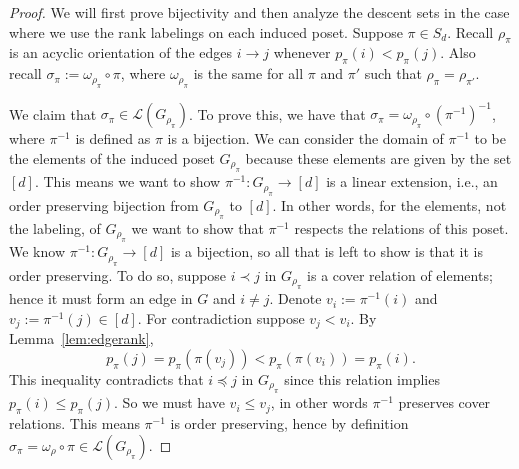 \documentclass[11pt]{amsart}
\newcommand{\rk}[1][\pi]{p_{#1}}
\begin{document}
\begin{proof}
    We will first prove bijectivity and then analyze the descent sets in the case where we use the rank labelings on each induced poset. 
    Suppose $\pi \in S_d$. Recall $\rho_\pi$ is an acyclic orientation of the edges $i \to j$ whenever $\rk(i) < \rk(j)$. Also recall $\sigma_\pi := \omega_{\rho_\pi} \circ \pi$, where $\omega_{\rho_\pi}$ is the same for all $\pi$ and $\pi'$ such that $\rho_\pi=\rho_{\pi'}$.
    
    We claim that $\sigma_\pi \in \mathcal{L}(G_{\rho_\pi})$. 
    To prove this, we have that $\sigma_\pi = \omega_{\rho_\pi} \circ (\pi^{-1})^{-1}$, where $\pi^{-1}$ is defined as $\pi$ is a bijection.
    We can consider the domain of $\pi^{-1}$ to be the elements of the induced poset $G_{\rho_\pi}$ because these elements are given by the set $[d]$.
    This means we want to show $\pi^{-1}:G_{\rho_\pi} \to [d]$ is a linear extension, i.e., an order preserving bijection from $G_{\rho_\pi}$ to $[d]$.
    In other words, for the elements, not the labeling, of $G_{\rho_\pi}$ we want to show that $\pi^{-1}$ respects the relations of this poset.
    We know $\pi^{-1}:G_{\rho_\pi} \to [d]$ is a bijection, so all that is left to show is that it is order preserving.
    To do so, suppose $i \prec j$ in $G_{\rho_\pi}$ is a cover relation of elements; hence it must form an edge in $G$ and $i \neq j$. 
    Denote $v_i := \pi^{-1}(i)$ and $v_j:=\pi^{-1}(j) \in [d]$. 
    For contradiction suppose $v_j < v_i$. By Lemma~\ref{lem:edgerank},
    \[
        \rk(j)= \rk(\pi(v_j))< \rk(\pi(v_i)) = \rk(i).
    \]
    This inequality contradicts that $i \preceq j$ in $G_{\rho_\pi}$ since this relation implies $\rk(i) \leq \rk(j)$. 
    So we must have $v_i \leq v_j$, in other words $\pi^{-1}$ preserves cover relations. 
    This means $\pi^{-1}$ is order preserving, hence by definition $\sigma_\pi = \omega_\rho \circ \pi \in \mathcal{L}(G_{\rho_\pi})$.


\end{proof}
\end{document}
